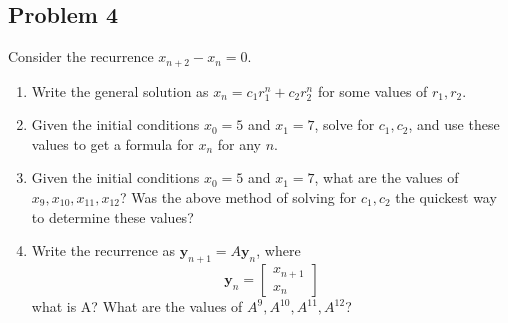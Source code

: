 \documentclass{article}
\begin{document}
\subsection*{Problem 4}
Consider the recurrence $x_{n+2} - x_n = 0$.
\begin{enumerate}
	\item Write the general solution as $x_n = c_1r_1^n + c_2r_2^n$ for some values of $r_1,r_2$.
	\item Given the initial conditions $x_0 = 5$ and $x_1 = 7$,
		solve for $c_1,c_2$, and use these values to get a formula for $x_n$ for any $n$.
	\item Given the initial conditions $x_0 = 5$ and $x_1 = 7$,
		what are the values of $x_9,x_{10},x_{11},x_{12}$?
		Was the above method of solving for $c_1,c_2$
		the quickest way to determine these values?
	\item Write the recurrence as $\mathbf{y}_{n+1} = A\mathbf{y}_n$, where
		\[
			\mathbf{y}_n = \begin{bmatrix} x_{n+1} \\ x_n \end{bmatrix}
		\]
		what is A? What are the values of $A^9, A^{10}, A^{11}, A^{12}$?
\end{enumerate}
\end{document}
